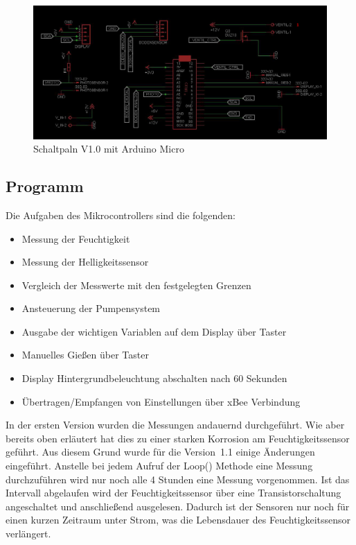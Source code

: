 \begin{figure}
	\centering
	\includegraphics[width=0.9\linewidth]{bilder/v1SchaltplanMicro0.JPG}
	\caption{Schaltpaln V1.0 mit Arduino Micro}
	\label{fig-Schaltplanv1.0}
\end{figure}

\subsection{Programm}
	

	Die Aufgaben des Mikrocontrollers sind die folgenden:
		\begin{itemize}
			\item Messung der Feuchtigkeit
			\item Messung der Helligkeitssensor
			\item Vergleich der Messwerte mit den festgelegten Grenzen
			\item Ansteuerung der Pumpensystem
			\item Ausgabe der wichtigen Variablen auf dem Display über Taster
			\item Manuelles Gießen über Taster
			\item Display Hintergrundbeleuchtung abschalten nach 60  Sekunden
			\item Übertragen/Empfangen von Einstellungen über xBee Verbindung
		\end{itemize}
		
	In der ersten Version wurden die Messungen andauernd durchgeführt. 
	Wie aber bereits oben erläutert hat dies zu einer starken Korrosion am Feuchtigkeitssensor geführt. 
	Aus diesem Grund wurde für die Version~1.1 einige Änderungen eingeführt. 
	Anstelle bei jedem Aufruf der Loop() Methode eine Messung durchzuführen wird nur noch alle 4 Stunden eine Messung vorgenommen. 
	Ist das Intervall abgelaufen wird der Feuchtigkeitssensor über eine Transistorschaltung angeschaltet und anschließend ausgelesen. 
	Dadurch ist der Sensoren nur noch für einen kurzen Zeitraum unter Strom, was die Lebensdauer des Feuchtigkeitssensor verlängert.
		
